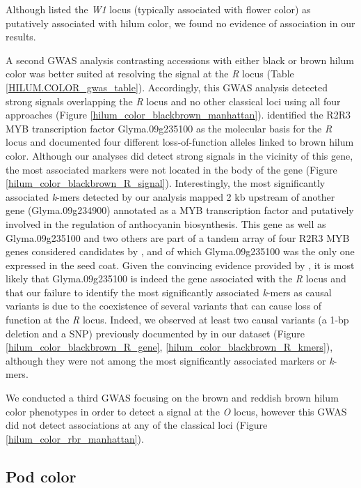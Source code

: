 Although \cite{bandillo2017} listed the \textit{W1} locus (typically associated
with flower color) as putatively associated with hilum color, we found no
evidence of association in our results.

A second GWAS analysis contrasting accessions with either black or brown hilum
color was better suited at resolving the signal at the \emph{R} locus (Table
\ref{HILUM.COLOR_gwas_table}). Accordingly, this GWAS analysis detected strong
signals overlapping the \emph{R} locus and no other classical loci using all
four approaches (Figure \ref{hilum_color_blackbrown_manhattan}).
\cite{gillman2011} identified the R2R3 MYB transcription factor Glyma.09g235100
as the molecular basis for the \emph{R} locus and documented four different
loss-of-function alleles linked to brown hilum color. Although our analyses did
detect strong signals in the vicinity of this gene, the most associated markers
were not located in the body of the gene (Figure
\ref{hilum_color_blackbrown_R_signal}). Interestingly, the most significantly
associated \emph{k}-mers detected by our analysis mapped 2 kb upstream of
another gene (Glyma.09g234900) annotated as a MYB transcription factor and
putatively involved in the regulation of anthocyanin biosynthesis. This gene
as well as Glyma.09g235100 and two others are part of a tandem array of four
R2R3 MYB genes considered candidates by \cite{gillman2011}, and of which
Glyma.09g235100 was the only one expressed in the seed coat. Given the
convincing evidence provided by \cite{gillman2011}, it is most likely that
Glyma.09g235100 is indeed the gene associated with the \emph{R} locus and that
our failure to identify the most significantly associated \emph{k}-mers as
causal variants is due to the coexistence of several variants that can cause
loss of function at the \emph{R} locus. Indeed, we observed at least two causal
variants (a 1-bp deletion and a SNP) previously documented by
\cite{gillman2011} in our dataset (Figure \ref{hilum_color_blackbrown_R_gene},
\ref{hilum_color_blackbrown_R_kmers}), although they were not among the most
significantly associated markers or \emph{k}-mers.

We conducted a third GWAS focusing on the brown and reddish brown hilum color
phenotypes in order to detect a signal at the \emph{O} locus, however this GWAS
did not detect associations at any of the classical loci (Figure
\ref{hilum_color_rbr_manhattan}).

\subsection*{Pod color}
\label{sv-gwas-pod-color}

